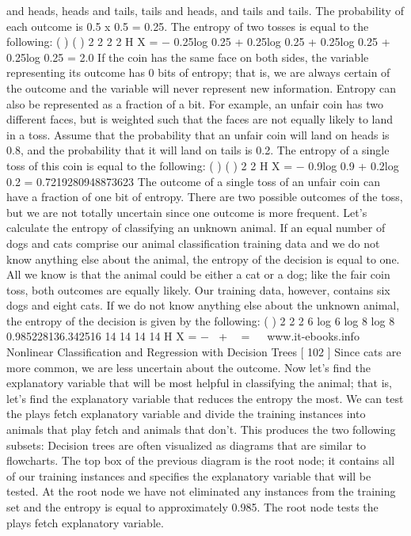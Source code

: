 and heads, heads and tails, tails and heads, and tails and tails. The probability of
each outcome is 0.5 x 0.5 = 0.25. The entropy of two tosses is equal to the following:
( ) ( ) 2 2 2 2 H X = − 0.25log 0.25 + 0.25log 0.25 + 0.25log 0.25 + 0.25log 0.25 = 2.0
If the coin has the same face on both sides, the variable representing its outcome has
0 bits of entropy; that is, we are always certain of the outcome and the variable will
never represent new information. Entropy can also be represented as a fraction of
a bit. For example, an unfair coin has two different faces, but is weighted such that
the faces are not equally likely to land in a toss. Assume that the probability that an
unfair coin will land on heads is 0.8, and the probability that it will land on tails is
0.2. The entropy of a single toss of this coin is equal to the following:
( ) ( ) 2 2 H X = − 0.9log 0.9 + 0.2log 0.2 = 0.7219280948873623
The outcome of a single toss of an unfair coin can have a fraction of one bit of
entropy. There are two possible outcomes of the toss, but we are not totally uncertain
since one outcome is more frequent.
Let's calculate the entropy of classifying an unknown animal. If an equal number of
dogs and cats comprise our animal classification training data and we do not know
anything else about the animal, the entropy of the decision is equal to one. All we
know is that the animal could be either a cat or a dog; like the fair coin toss, both
outcomes are equally likely. Our training data, however, contains six dogs and eight
cats. If we do not know anything else about the unknown animal, the entropy of the
decision is given by the following:
( ) 2 2 2
6 log 6 log 8 log 8 0.985228136.342516
14 14 14 14
H X = − +  =
 
www.it-ebooks.info
Nonlinear Classification and Regression with Decision Trees
[ 102 ]
Since cats are more common, we are less uncertain about the outcome. Now let's find
the explanatory variable that will be most helpful in classifying the animal; that is,
let's find the explanatory variable that reduces the entropy the most. We can test the
plays fetch explanatory variable and divide the training instances into animals
that play fetch and animals that don't. This produces the two following subsets:
Decision trees are often visualized as diagrams that are similar to flowcharts. The
top box of the previous diagram is the root node; it contains all of our training
instances and specifies the explanatory variable that will be tested. At the root node
we have not eliminated any instances from the training set and the entropy is equal
to approximately 0.985. The root node tests the plays fetch explanatory variable.
